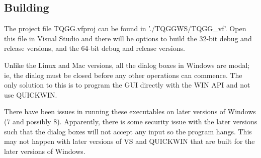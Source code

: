\documentclass[10pt]{article}
\begin{document}
\subsection{Building}
The project file TQGG.vfproj can be found in './TQGGWS/TQGG\_vf'. Open this file in Visual Studio
and there will be options to build the 32-bit debug and release versions, and the 64-bit debug 
and release versions.

Unlike the Linux and Mac versions, all the dialog boxes in Windows are modal; ie, the dialog must be 
closed before any other operations can commence. The only solution to this is to program the GUI
directly with the WIN API and not use QUICKWIN.

There have been issues in running these executables on later versions of Windows (7 and possibly 8).
Apparently, there is some security issue with the later versions such that the dialog boxes will
not accept any input so the program hangs. This may not happen with later versions of VS and QUICKWIN that
are built for the later versions of Windows.
\end{document}
